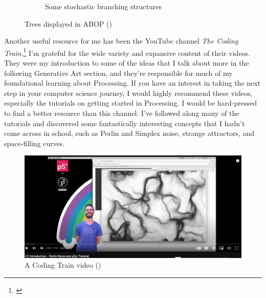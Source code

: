 \documentclass[12pt,twoside]{reedthesis}
\begin{document}
\begin{figure}[h]
\begin{subfigure}{0.6\linewidth}
		\caption{Some stochastic branching structures}
		\label {ABOP4}
	\end{subfigure}
	\caption{Trees displayed in ABOP (\cite{ABOP1990})}
	\label{ABOPtrees}
	\end{figure}
	
	Another useful resource for me has been the YouTube channel \textit{The Coding Train}.\footnote{\cite{codingTrain}} I'm grateful for the wide variety and expansive content of their videos. They were my introduction to some of the ideas that I talk about more in the following Generative Art section, and they're responsible for much of my foundational learning about Processing. If you have an interest in taking the next step in your computer science journey, I would highly recommend these videos, especially the tutorials on getting started in Processing. I would be hard-pressed to find a better resource than this channel. I've followed along many of the tutorials and discovered some fantastically interesting concepts that I hadn't come across in school, such as Perlin and Simplex noise, strange attractors, and space-filling curves.
	
	
	\begin{figure}[h]
	\centering
	\includegraphics[width=\linewidth]{Images/CodingTrain}
	\caption{A Coding Train video (\cite{codingTrain})}
	\label{CodingTrain}
	\end{figure}
	
\end{document}
